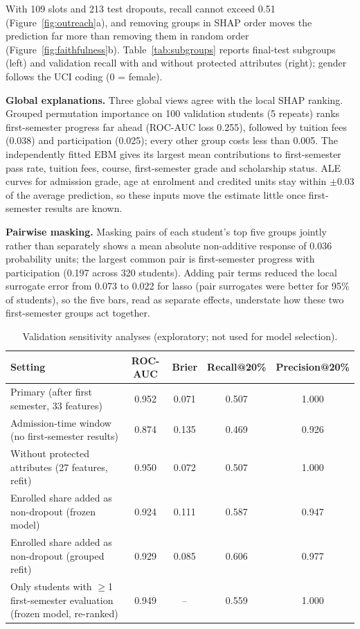 With 109 slots and 213 test dropouts, recall cannot exceed 0.51 (Figure~\ref{fig:outreach}a), and
removing groups in SHAP order moves the prediction far more than removing them in random order
(Figure~\ref{fig:faithfulness}b). Table~\ref{tab:subgroups} reports final-test subgroups (left) and
validation recall with and without protected attributes (right); gender follows the UCI coding
(0 = female).

\textbf{Global explanations.} Three global views agree with the local SHAP ranking. Grouped
permutation importance on 100 validation students (5 repeats) ranks first-semester progress far
ahead (ROC-AUC loss 0.255), followed by tuition fees (0.038) and participation (0.025); every other
group costs less than 0.005. The independently fitted EBM gives its largest mean contributions to
first-semester pass rate, tuition fees, course, first-semester grade and scholarship status. ALE
curves for admission grade, age at enrolment and credited units stay within $\pm0.03$ of the average
prediction, so these inputs move the estimate little once first-semester results are known.

\textbf{Pairwise masking.} Masking pairs of each student's top five groups jointly rather than
separately shows a mean absolute non-additive response of 0.036 probability units; the largest common
pair is first-semester progress with participation (0.197 across 320 students). Adding pair terms
reduced the local surrogate error from 0.073 to 0.022 for lasso (pair surrogates were better for
95\% of students), so the five bars, read as separate effects, understate how these two
first-semester groups act together.

\begin{table}[H]
\centering
\caption{Validation sensitivity analyses (exploratory; not used for model selection).}
\label{tab:sensitivity}
\footnotesize
\begin{tabular}{@{}lcccc@{}}
\toprule
\textbf{Setting} & \textbf{ROC-AUC} & \textbf{Brier} & \textbf{Recall@20\%} & \textbf{Precision@20\%} \\
\midrule
Primary (after first semester, 33 features) & 0.952 & 0.071 & 0.507 & 1.000 \\
Admission-time window (no first-semester results) & 0.874 & 0.135 & 0.469 & 0.926 \\
Without protected attributes (27 features, refit) & 0.950 & 0.072 & 0.507 & 1.000 \\
Enrolled share added as non-dropout (frozen model) & 0.924 & 0.111 & 0.587 & 0.947 \\
Enrolled share added as non-dropout (grouped refit) & 0.929 & 0.085 & 0.606 & 0.977 \\
Only students with $\geq$1 first-semester evaluation (frozen model, re-ranked) & 0.949 & -- & 0.559 & 1.000 \\
\bottomrule
\end{tabular}
\end{table}

